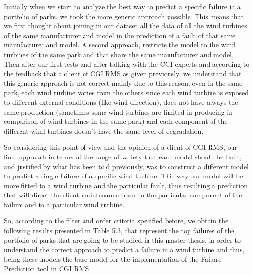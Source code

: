 Initially when we start to analyze the best way to predict a specific failure in a portfolio of parks, we took the more generic approach possible. This means that we first thought about joining in our dataset all the data of all the wind turbines of the same manufacturer and model in the prediction of a fault of that same manufacturer and model. A second approach, restricts the model to the wind turbines of the same park and that share the same manufacturer and model. Then after our first tests and after talking with the CGI experts and according to the feedback that a client of CGI RMS as given previously, we understand that this generic approach is not correct mainly due to this reason: even in the same park, each wind turbine varies from the others since each wind turbine is exposed to different external conditions (like wind direction), does not have always the same production (sometimes some wind turbines are limited in producing in comparison of wind turbines in the same park) and each component of the different wind turbines doesn't have the same level of degradation. 


So considering this point of view and the opinion of a client of CGI RMS, our final approach in terms of the range of variety that each model should be built, and justified by what has been told previously, was to construct a different model to predict a single failure of a specific wind turbine. This way our model will be more fitted to a wind turbine and the particular fault, thus resulting a prediction that will direct the client maintenance team to the particular component of the failure and to a particular wind turbine.

So, according to the filter and order criteria specified before, we obtain the following results presented in Table 5.3, that represent the top failures of the portfolio of parks that are going to be studied in this master thesis, in order to understand the correct approach to predict a failure in a wind turbine and thus, being these models the base model for the implementation of the Failure Prediction tool in CGI RMS.

